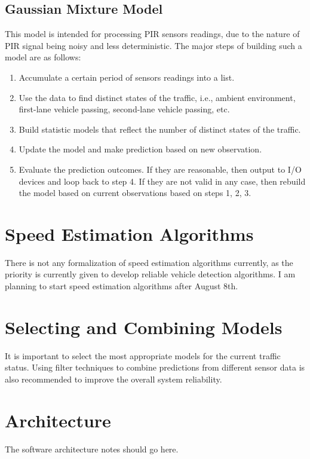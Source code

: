 \documentclass[letter]{article}
\begin{document}
\subsection{Gaussian Mixture Model}
This model is intended for processing PIR sensors readings, due to the nature of PIR signal being noisy and less deterministic. The major steps of building such a model are as follows:
\begin{enumerate}
\item Accumulate a certain period of sensors readings into a list. 
\item Use the data to find distinct states of the traffic, i.e., ambient environment, first-lane vehicle passing, second-lane vehicle passing, etc.
\item Build statistic models that reflect the number of distinct states of the traffic.
\item Update the model and make prediction based on new observation.
\item Evaluate the prediction outcomes. If they are reasonable, then output to I/O devices and loop back to step 4. If they are not valid in any case, then rebuild the model based on current observations based on steps 1, 2, 3.
\end{enumerate}



\section{Speed Estimation Algorithms}
There is not any formalization of speed estimation algorithms currently, as the priority is currently given to develop reliable vehicle detection algorithms. I am planning to start speed estimation algorithms after August 8th.

\section{Selecting and Combining Models}
It is important to select the most appropriate models for the current traffic status. Using filter techniques to combine predictions from different sensor data is also recommended to improve the overall system reliability.

\section{Architecture}
The software architecture notes should go here.
\end{document}
